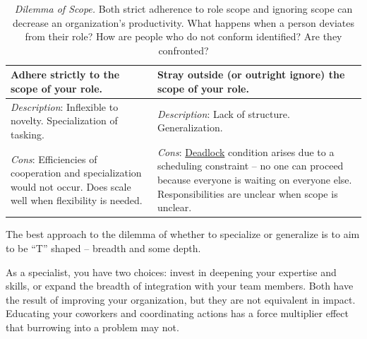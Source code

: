 \begin{center}
\begin{table}[H] %
\begin{tabular}{ | m{\dilemmatablewidth}| m{\dilemmatablewidth} | }
  \hline
  \textbf{Adhere strictly to the scope of your role.} & 
  \textbf{Stray outside (or outright ignore) the scope of your role.} \\ 
  \hline
  \textit{Description}: Inflexible to novelty. Specialization of tasking. & 
  \textit{Description}: Lack of structure. Generalization. \\ 
  \hline
  \textit{Cons}: Efficiencies of cooperation and specialization would not occur. Does scale well when flexibility is needed.  & 
  \textit{Cons}: \href{https://en.wikipedia.org/wiki/Deadlock}{Deadlock} 
  \index{Wikipedia!deadlock@\href{https://en.wikipedia.org/wiki/Deadlock}{deadlock}}
  condition arises due to a scheduling constraint -- no one can proceed because everyone is waiting on everyone else. Responsibilities are unclear when scope is unclear. \\  
  \hline
\end{tabular}
\caption{
\textit{Dilemma of Scope.}
Both strict adherence to role scope and ignoring scope can decrease an organization's productivity. 
What happens when a person deviates from their role?
How are people who do not conform identified? Are they confronted?
}
\label{table:dilemma-personal-scope-of-activity}
\end{table}
\end{center}

The best approach to the dilemma of whether to specialize or generalize is to aim to be ``T'' shaped -- breadth and some depth.

As a specialist, you have two choices: invest in deepening your expertise and skills, or expand the breadth of integration with your team members. Both have the result of improving your organization, but they are not equivalent in impact. Educating your coworkers and coordinating actions has a force multiplier effect that burrowing into a problem may not.



